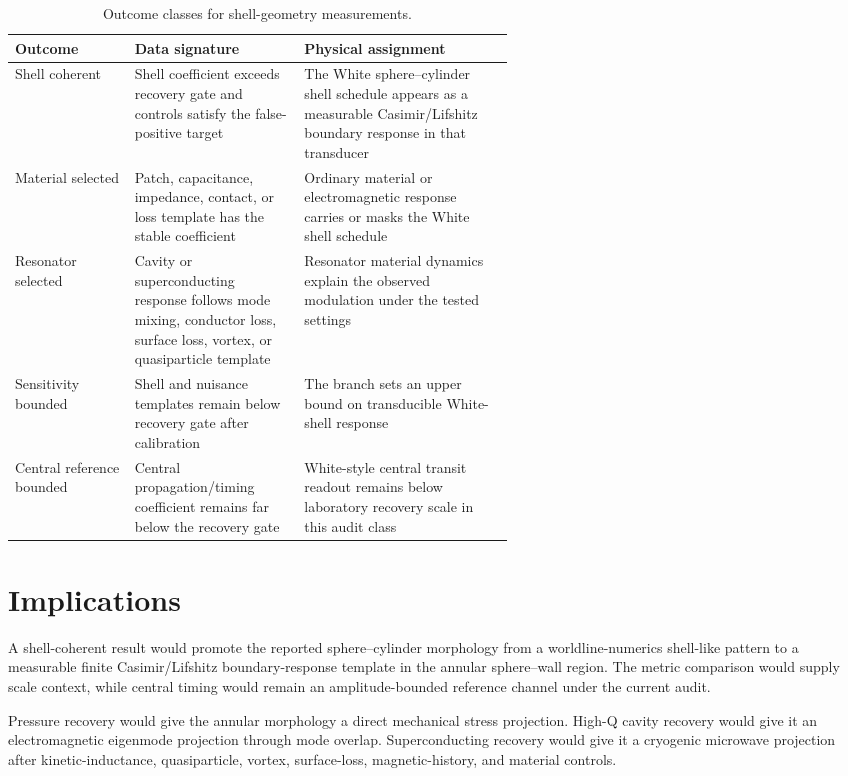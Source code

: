 \documentclass[11pt]{article}
\begin{document}
\begin{table}[htbp]
\centering
\caption{Outcome classes for shell-geometry measurements.}
\label{tab:outcomes}
\small
\begin{tabularx}{\linewidth}{>{\raggedright\arraybackslash}p{0.24\linewidth}
>{\raggedright\arraybackslash}p{0.34\linewidth}
>{\raggedright\arraybackslash}X}
\toprule
Outcome & Data signature & Physical assignment \\
\midrule
Shell coherent & Shell coefficient exceeds recovery gate and controls satisfy the false-positive target & The White sphere--cylinder shell schedule appears as a measurable Casimir/Lifshitz boundary response in that transducer \\
Material selected & Patch, capacitance, impedance, contact, or loss template has the stable coefficient & Ordinary material or electromagnetic response carries or masks the White shell schedule \\
Resonator selected & Cavity or superconducting response follows mode mixing, conductor loss, surface loss, vortex, or quasiparticle template & Resonator material dynamics explain the observed modulation under the tested settings \\
Sensitivity bounded & Shell and nuisance templates remain below recovery gate after calibration & The branch sets an upper bound on transducible White-shell response \\
Central reference bounded & Central propagation/timing coefficient remains far below the recovery gate & White-style central transit readout remains below laboratory recovery scale in this audit class \\
\bottomrule
\end{tabularx}
\end{table}

\FloatBarrier
\clearpage

\section{Implications}

A shell-coherent result would promote the reported sphere--cylinder morphology
from a worldline-numerics shell-like pattern to a measurable finite
Casimir/Lifshitz boundary-response template in the annular sphere--wall
region. The metric comparison would supply scale context, while central timing
would remain an amplitude-bounded reference channel under the current audit.

Pressure recovery would give the annular morphology a direct mechanical
stress projection. High-Q cavity recovery would give it an electromagnetic
eigenmode projection through mode overlap. Superconducting recovery would give
it a cryogenic microwave projection after kinetic-inductance, quasiparticle,
vortex, surface-loss, magnetic-history, and material controls.
\end{document}
